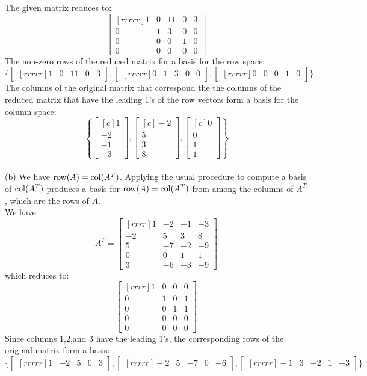 \begin{solution}
The given matrix reduces to:
$$
\begin{bmatrix}[rrrrr]
1&0&11&0&3\\
0&1&3&0&0\\
0&0&0&1&0\\
0&0&0&0&0
\end{bmatrix}
$$
The non-zero rows of the reduced matrix for a basis for the row space:
$$
\{
\begin{bmatrix}[rrrrr]
1&0&11&0&3
\end{bmatrix},
\begin{bmatrix}[rrrrr]
0&1&3&0&0
\end{bmatrix},
\begin{bmatrix}[rrrrr]
0&0&0&1&0
\end{bmatrix}
\}
$$
The columns of the original matrix that correspond the the columns of the reduced matrix that have the leading 1's of the row vectors form a basis for the column space:
$$
\left\{
\begin{bmatrix}[c]
1\\
-2\\
-1\\
-3
\end{bmatrix},
\begin{bmatrix}[c]
-2\\
5\\
3\\
8
\end{bmatrix},
\begin{bmatrix}[c]
0\\
0\\
1\\
1
\end{bmatrix}
\right\}
$$
\\
(b) 
We have $\operatorname{row}(A)=\operatorname{col}(A^T)$. Applying the usual procedure to compute a basis of $\operatorname{col}(A^T)$ produces a basis for $\operatorname{row}(A)=\operatorname{col}(A^T)$ from among the columns of $A^T$, which are the rows of $A$. 
\\
We have 
$$A^T=
\begin{bmatrix}[rrrr]
1&-2&-1&-3\\
-2&5&3&8\\
5&-7&-2&-9\\
0&0&1&1\\
3&-6&-3&-9
\end{bmatrix}
$$
which reduces to:
$$
\begin{bmatrix}[rrrr]
1&0&0&0\\
0&1&0&1\\
0&0&1&1\\
0&0&0&0\\
0&0&0&0
\end{bmatrix}
$$
Since columns 1,2,and 3 have the leading 1's, the corresponding rows of the original matrix form a basis:
$$
\{
\begin{bmatrix}[rrrrr]
1&-2&5&0&3
\end{bmatrix},
\begin{bmatrix}[rrrrr]
-2&5&-7&0&-6
\end{bmatrix},
\begin{bmatrix}[rrrrr]
-1&3&-2&1&-3
\end{bmatrix}
\}
$$
\end{solution}
